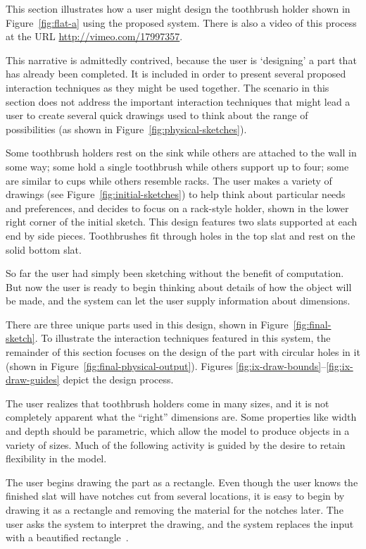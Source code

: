\documentclass[12pt]{article}
\begin{document}
This section illustrates how a user might design the toothbrush holder
shown in Figure~\ref{fig:flat-a} using the proposed system. There is
also a video of this process at the URL
\href{http://vimeo.com/17997357}{http://vimeo.com/17997357}.

This narrative is admittedly contrived, because the user is
`designing' a part that has already been completed. It is included in
order to present several proposed interaction techniques as they might
be used together. The scenario in this section does not address the
important interaction techniques that might lead a user to create
several quick drawings used to think about the range of possibilities
(as shown in Figure~\ref{fig:physical-sketches}).

Some toothbrush holders rest on the sink while others are attached to
the wall in some way; some hold a single toothbrush while others
support up to four; some are similar to cups while others resemble
racks. The user makes a variety of drawings (see
Figure~\ref{fig:initial-sketches}) to help think about particular
needs and preferences, and decides to focus on a rack-style holder,
shown in the lower right corner of the initial sketch. This design
features two slats supported at each end by side pieces. Toothbrushes
fit through holes in the top slat and rest on the solid bottom slat.

So far the user had simply been sketching without the benefit of
computation. But now the user is ready to begin thinking about details
of how the object will be made, and the system can let the user supply
information about dimensions.

There are three unique parts used in this design, shown in
Figure~\ref{fig:final-sketch}. To illustrate the interaction
techniques featured in this system, the remainder of this section
focuses on the design of the part with circular holes in it (shown in
Figure~\ref{fig:final-physical-output}). Figures
\ref{fig:ix-draw-bounds}--\ref{fig:ix-draw-guides} depict the design
process.

The user realizes that toothbrush holders come in many sizes, and it
is not completely apparent what the ``right'' dimensions are. Some
properties like width and depth should be parametric, which allow the
model to produce objects in a variety of sizes. Much of the following
activity is guided by the desire to retain flexibility in the model.

The user begins drawing the part as a rectangle. Even though the user
knows the finished slat will have notches cut from several locations,
it is easy to begin by drawing it as a rectangle and removing the
material for the notches later. The user asks the system to interpret
the drawing, and the system replaces the input with a beautified
rectangle~\cite{pavlidis-beautifier}.
\end{document}
